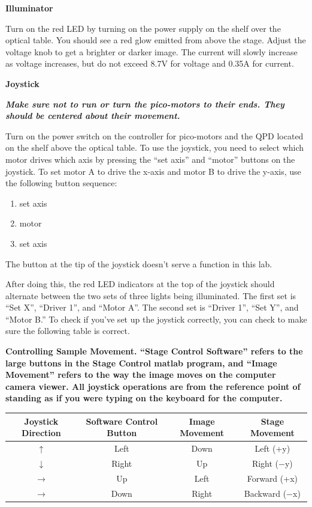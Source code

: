 \documentclass{../lab}
\begin{document}
\textbf{Illuminator}

Turn on the red LED by turning on the power supply on the shelf over the optical table. You should see a  red glow emitted from above the stage. Adjust the voltage knob to get a brighter or darker image. The current will slowly increase as voltage increases, but do not exceed 8.7V for voltage and 0.35A for current.

\textbf{Joystick}

\emph{\textbf{Make sure not to run or turn the pico-motors to their ends. They should be centered about their movement.}}

\newpage

Turn on the power switch on the controller for pico-motors and the QPD located on the shelf above the optical table. To use the joystick, you need to select which motor drives which axis by pressing the ``set axis'' and ``motor'' buttons on the joystick. To set motor A to drive the x-axis and motor B to drive the y-axis, use the following button sequence:

\begin{enumerate}
    \item set axis

    \item motor

    \item set axis
\end{enumerate}

The button at the tip of the joystick doesn't serve a function in this lab.

After doing this, the red LED indicators at the top of the joystick should alternate between the two sets of three lights being illuminated. The first set is ``Set X'', ``Driver 1'', and ``Motor A''. The second set is ``Driver 1'', ``Set Y'', and ``Motor B.'' To check if you've set up the joystick correctly, you can check to make sure the following table is correct.

\textbf{Controlling Sample Movement. ``Stage Control Software'' refers to the large buttons in the Stage Control matlab program, and ``Image Movement'' refers to the way the image moves on the computer camera viewer.  All joystick operations are from the reference point of standing as if you were typing on the keyboard for the computer.}

\begin{center}
    \begin{tabular}{c|c|c|c}
        Joystick Direction & Software Control Button & Image Movement & Stage Movement \\\hline
        $\uparrow$    & Left  & Down  & Left (+y) \\\hline
        $\downarrow$  & Right & Up    & Right ($-$y) \\\hline
        $\rightarrow$ & Up    & Left  & Forward (+x) \\\hline
        $\rightarrow$ & Down  & Right & Backward ($-$x)
    \end{tabular}
\end{center}
\end{document}
